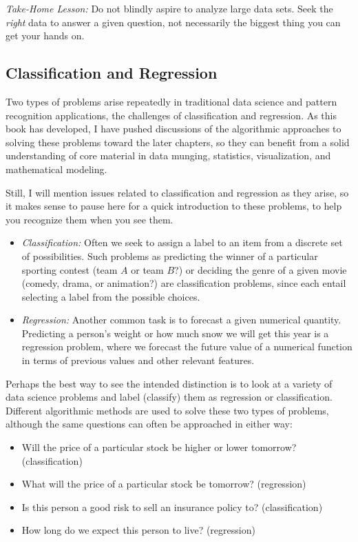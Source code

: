 \documentclass[10pt]{article}
\begin{document}
\emph{Take-Home Lesson:} Do not blindly aspire to analyze large data sets. Seek the \emph{right} data to answer a given question, not necessarily the biggest thing you can get your hands on.

\subsection{Classification and Regression}
Two types of problems arise repeatedly in traditional data science and pattern recognition applications, the challenges of classification and regression. As this book has developed, I have pushed discussions of the algorithmic approaches to solving these problems toward the later chapters, so they can benefit from a solid understanding of core material in data munging, statistics, visualization, and mathematical modeling.

Still, I will mention issues related to classification and regression as they arise, so it makes sense to pause here for a quick introduction to these problems, to help you recognize them when you see them.

\begin{itemize}
  \item \emph{Classification:} Often we seek to assign a label to an item from a discrete set of possibilities. Such problems as predicting the winner of a particular sporting contest (team \( A \) or team \( B \)?) or deciding the genre of a given movie (comedy, drama, or animation?) are classification problems, since each entail selecting a label from the possible choices.
  \item \emph{Regression:} Another common task is to forecast a given numerical quantity. Predicting a person's weight or how much snow we will get this year is a regression problem, where we forecast the future value of a numerical function in terms of previous values and other relevant features.
\end{itemize}

Perhaps the best way to see the intended distinction is to look at a variety of data science problems and label (classify) them as regression or classification. Different algorithmic methods are used to solve these two types of problems, although the same questions can often be approached in either way:

\begin{itemize}
  \item Will the price of a particular stock be higher or lower tomorrow? (classification)
  \item What will the price of a particular stock be tomorrow? (regression)
  \item Is this person a good risk to sell an insurance policy to? (classification)
  \item How long do we expect this person to live? (regression)
\end{itemize}
\end{document}

